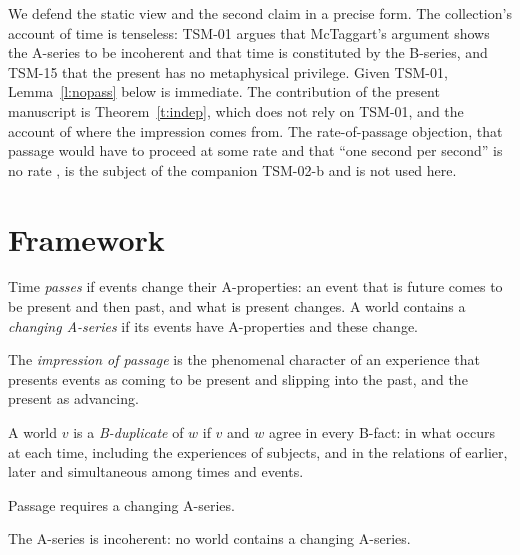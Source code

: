 \documentclass{situationist-preprint}
\begin{document}
We defend the static view and the second claim in a precise form. The collection's account of time is tenseless: TSM-01 argues that McTaggart's argument shows the A-series to be incoherent and that time is constituted by the B-series, and TSM-15 that the present has no metaphysical privilege. Given TSM-01, Lemma~\ref{l:nopass} below is immediate. The contribution of the present manuscript is Theorem~\ref{t:indep}, which does not rely on TSM-01, and the account of where the impression comes from. The rate-of-passage objection, that passage would have to proceed at some rate and that \enquote{one second per second} is no rate \citep{Markosian1993}, is the subject of the companion TSM-02-b and is not used here.

\section{Framework}

\begin{definition}[Passage]\label{d:passage}
Time \emph{passes} if events change their A-properties: an event that is future comes to be present and then past, and what is present changes. A world contains a \emph{changing A-series} if its events have A-properties and these change.
\end{definition}

\begin{definition}\label{d:impression}
The \emph{impression of passage} is the phenomenal character of an experience that presents events as coming to be present and slipping into the past, and the present as advancing.
\end{definition}

\begin{definition}[B-duplicate]\label{d:bdup}
A world $v$ is a \emph{B-duplicate} of $w$ if $v$ and $w$ agree in every B-fact: in what occurs at each time, including the experiences of subjects, and in the relations of earlier, later and simultaneous among times and events.
\end{definition}

\begin{assumption}\label{a:requiresA}
Passage requires a changing A-series.
\end{assumption}

\begin{assumption}[TSM-01]\label{a:incoherent}
The A-series is incoherent: no world contains a changing A-series.
\end{assumption}
\end{document}
